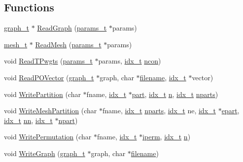 \subsection*{Functions}
\begin{DoxyCompactItemize}
\item 
\hyperlink{a00734}{graph\+\_\+t} $\ast$ \hyperlink{a00858_a9add4a9694da47d84beb4a7638a7b673}{Read\+Graph} (\hyperlink{a00706}{params\+\_\+t} $\ast$params)
\item 
\hyperlink{a00738}{mesh\+\_\+t} $\ast$ \hyperlink{a00858_a1ce1ff57b84c6de0f3beb24b48bf9af9}{Read\+Mesh} (\hyperlink{a00706}{params\+\_\+t} $\ast$params)
\item 
void \hyperlink{a00858_a12b940ccee061b8787088fbe16245f46}{Read\+T\+Pwgts} (\hyperlink{a00706}{params\+\_\+t} $\ast$params, \hyperlink{a00876_aaa5262be3e700770163401acb0150f52}{idx\+\_\+t} \hyperlink{a00879_ac1dd31740e8f97fb57dc917ded30253f}{ncon})
\item 
void \hyperlink{a00858_a65a7c382444e5132dafddb75b6117754}{Read\+P\+O\+Vector} (\hyperlink{a00734}{graph\+\_\+t} $\ast$graph, char $\ast$\hyperlink{a00623_a42a21beb8018ac623f4d09db1343b9cf}{filename}, \hyperlink{a00876_aaa5262be3e700770163401acb0150f52}{idx\+\_\+t} $\ast$vector)
\item 
void \hyperlink{a00858_ab677f01037192ca57a5a167df7d350d3}{Write\+Partition} (char $\ast$fname, \hyperlink{a00876_aaa5262be3e700770163401acb0150f52}{idx\+\_\+t} $\ast$\hyperlink{a00879_a0a9ea8670f88d6db1e021fee2dcd94be}{part}, \hyperlink{a00876_aaa5262be3e700770163401acb0150f52}{idx\+\_\+t} \hyperlink{a00623_a781a04ab095280f838ff3eb0e51312e0}{n}, \hyperlink{a00876_aaa5262be3e700770163401acb0150f52}{idx\+\_\+t} \hyperlink{a00879_aad88065af88fd6759101788a8e15ce9e}{nparts})
\item 
void \hyperlink{a00858_a358cab47bd66ff23614f7f24996ba64c}{Write\+Mesh\+Partition} (char $\ast$fname, \hyperlink{a00876_aaa5262be3e700770163401acb0150f52}{idx\+\_\+t} \hyperlink{a00879_aad88065af88fd6759101788a8e15ce9e}{nparts}, \hyperlink{a00876_aaa5262be3e700770163401acb0150f52}{idx\+\_\+t} ne, \hyperlink{a00876_aaa5262be3e700770163401acb0150f52}{idx\+\_\+t} $\ast$\hyperlink{a00879_a3be6f43a8ac8840d4c97578068513c18}{epart}, \hyperlink{a00876_aaa5262be3e700770163401acb0150f52}{idx\+\_\+t} \hyperlink{a00605_a29f8cac5eb66bce13c51cf794c698f74}{nn}, \hyperlink{a00876_aaa5262be3e700770163401acb0150f52}{idx\+\_\+t} $\ast$\hyperlink{a00879_aa5e2883dfb3577926b3b5842698947bc}{npart})
\item 
void \hyperlink{a00858_a902cc00039a655f4b6ec0292e0410ef2}{Write\+Permutation} (char $\ast$fname, \hyperlink{a00876_aaa5262be3e700770163401acb0150f52}{idx\+\_\+t} $\ast$\hyperlink{a00879_a76ba0ee1ced7914ce87ac7eab1758c42}{iperm}, \hyperlink{a00876_aaa5262be3e700770163401acb0150f52}{idx\+\_\+t} \hyperlink{a00623_a781a04ab095280f838ff3eb0e51312e0}{n})
\item 
void \hyperlink{a00858_a91b3b24f2b508da8f2e2df7bc2c94cc6}{Write\+Graph} (\hyperlink{a00734}{graph\+\_\+t} $\ast$graph, char $\ast$\hyperlink{a00623_a42a21beb8018ac623f4d09db1343b9cf}{filename})
\end{DoxyCompactItemize}


